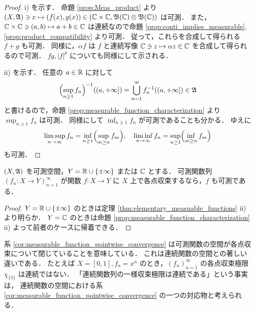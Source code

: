 \begin{proof}
    \textrm{i)} を示す．
    命題 \ref{prop:Meas_product} より $(X,\mathfrak{A})\ni x\mapsto(f(x),g(x))\in(\mathbb{C}\times\mathbb{C},\mathfrak{B}(\mathbb{C})\otimes\mathfrak{B}(\mathbb{C}))$ は可測．
    また，$\mathbb{C}\times\mathbb{C}\ni(a,b)\mapsto a+b\in\mathbb{C}$ は連続なので命題 \ref{prop:conti_implies_measurable}, \ref{prop:product_compatibility} より可測．
    従って，これらを合成して得られる $f+g$ も可測．
    同様に，$\alpha f$ は $f$ と連続写像 $\mathbb{C}\ni z\mapsto\alpha z\in\mathbb{C}$ を合成して得られるので可測．
    $fg,|f|^p$ についても同様にして示される．

    \textrm{ii)} を示す．
    任意の $a\in\mathbb{R}$ に対して
    \begin{align*}
        \Bigl(\sup_{n\ge1}f_n\Bigr)^{-1}((a,+\infty])
        =\bigcup_{n=1}^\infty f_n^{-1}((a,+\infty])\in\mathfrak{A}
    \end{align*}
    と書けるので，命題 \ref{prop:measurable_function_characterization} より $\sup_{n\ge1}f_n$ は可測．
    同様にして $\inf_{n\ge1}f_n$ が可測であることも分かる．
    ゆえに
    \begin{align*}
        \limsup_{n\to\infty}f_n=\inf_{n\ge1}\Bigl(\sup_{m\ge n}f_m\Bigr),\quad
        \liminf_{n\to\infty}f_n=\sup_{n\ge1}\Bigl(\inf_{m\ge n}f_m\Bigr)
    \end{align*}
    も可測．
\end{proof}

\begin{corollary}\label{cor:measurable_function_pointwise_convergence}
    $(X,\mathfrak{A})$ を可測空間，$Y=\mathbb{R}\cup\{\pm\infty\}$ または $\mathbb{C}$ とする．
    可測関数列 $(f_n:X\to Y)_{n=1}^\infty$ が関数 $f:X\to Y$ に $X$ 上で各点収束するなら，$f$ も可測である．
\end{corollary}

\begin{proof}
    $Y=\mathbb{R}\cup\{\pm\infty\}$ のときは定理 \ref{thm:elementary_measuable_functions} \textrm{ii)} より明らか．
    $Y=\mathbb{C}$ のときは命題 \ref{prop:measurable_function_characterization} \textrm{ii)} よって前者のケースに帰着できる．
\end{proof}

\begin{remark}
    系 \ref{cor:measurable_function_pointwise_convergence} は可測関数の空間が各点収束について閉じていることを意味している．
    これは連続関数の空間との著しい違いである．
    たとえば $X=[0,1],f_n=x^n$ のとき，$(f_n)_{n=1}^\infty$ の各点収束極限 $\chi_{\{1\}}$ は連続ではない．
    「連続関数列の一様収束極限は連続である」という事実は，
    連続関数の空間における系 \ref{cor:measurable_function_pointwise_convergence} の一つの対応物と考えられる．
\end{remark}
